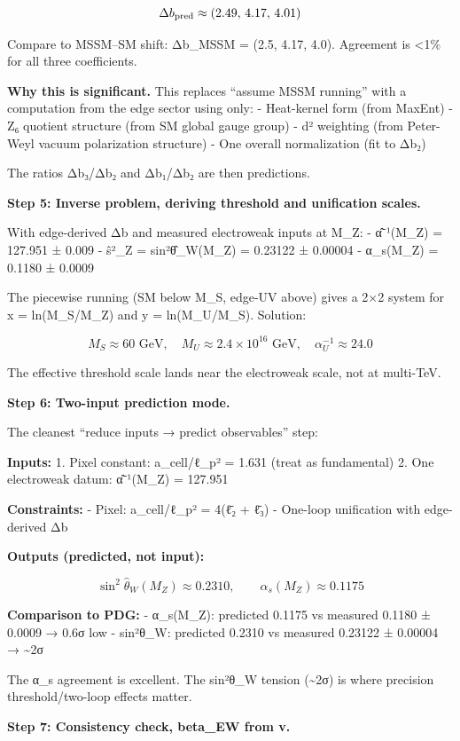 \documentclass[
]{article}
\begin{document}
\[
\Delta b_{\rm pred} \approx (2.49, \, 4.17, \, 4.01)
\]

Compare to MSSM--SM shift: Δb\_MSSM = (2.5, 4.17, 4.0). Agreement is
\textless1\% for all three coefficients.

\textbf{Why this is significant.} This replaces ``assume MSSM running''
with a computation from the edge sector using only: - Heat-kernel form
(from MaxEnt) - Z₆ quotient structure (from SM global gauge group) - d²
weighting (from Peter-Weyl vacuum polarization structure) - One overall
normalization (fit to Δb₂)

The ratios Δb₃/Δb₂ and Δb₁/Δb₂ are then predictions.

\textbf{Step 5: Inverse problem, deriving threshold and unification
scales.}

With edge-derived Δb and measured electroweak inputs at M\_Z: -
α̂⁻¹(M\_Z) = 127.951 ± 0.009 - ŝ²\_Z = sin²θ̂\_W(M\_Z) = 0.23122 ± 0.00004
- α\_s(M\_Z) = 0.1180 ± 0.0009

The piecewise running (SM below M\_S, edge-UV above) gives a 2×2 system
for x = ln(M\_S/M\_Z) and y = ln(M\_U/M\_S). Solution:

\[
M_S \approx 60 \text{ GeV}, \quad M_U \approx 2.4 \times 10^{16} \text{ GeV}, \quad \alpha_U^{-1} \approx 24.0
\]

The effective threshold scale lands near the electroweak scale, not at
multi-TeV.

\textbf{Step 6: Two-input prediction mode.}

The cleanest ``reduce inputs → predict observables'' step:

\textbf{Inputs:} 1. Pixel constant: a\_cell/ℓ\_p² = 1.631 (treat as
fundamental) 2. One electroweak datum: α̂⁻¹(M\_Z) = 127.951

\textbf{Constraints:} - Pixel: a\_cell/ℓ\_p² = 4(ℓ̄₂ + ℓ̄₃) - One-loop
unification with edge-derived Δb

\textbf{Outputs (predicted, not input):}

\[
\sin^2\hat{\theta}_W(M_Z) \approx 0.2310, \qquad \alpha_s(M_Z) \approx 0.1175
\]

\textbf{Comparison to PDG:} - α\_s(M\_Z): predicted 0.1175 vs measured
0.1180 ± 0.0009 → 0.6σ low - sin²θ\_W: predicted 0.2310 vs measured
0.23122 ± 0.00004 → \textasciitilde2σ

The α\_s agreement is excellent. The sin²θ\_W tension
(\textasciitilde2σ) is where precision threshold/two-loop effects
matter.

\textbf{Step 7: Consistency check, beta\_EW from v.}
\end{document}
